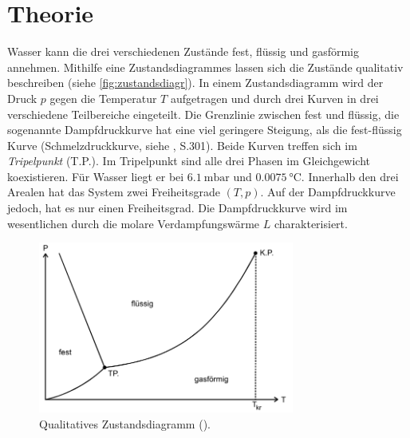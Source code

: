 \section{Theorie}
\label{sec:Theorie}
Wasser kann die drei verschiedenen Zustände fest, flüssig und gasförmig annehmen. Mithilfe eine Zustandsdiagrammes lassen sich die 
Zustände qualitativ beschreiben (siehe \autoref{fig:zustandsdiagr}). In einem Zustandsdiagramm wird der Druck $p$ gegen die Temperatur $T$ 
aufgetragen und durch drei Kurven in drei verschiedene Teilbereiche eingeteilt. Die Grenzlinie zwischen fest und flüssig, die sogenannte 
Dampfdruckkurve hat eine viel geringere Steigung, als die fest-flüssig Kurve (Schmelzdruckkurve, siehe \cite{gerthsen}, S.301). Beide Kurven
treffen sich im \textit{Tripelpunkt} (T.P.). Im Tripelpunkt sind alle drei Phasen im Gleichgewicht koexistieren. Für Wasser liegt er bei 
$\SI{6.1}{\milli\bar}$ und $\SI{0.0075}{\celsius}$.
Innerhalb den drei Arealen hat das System zwei Freiheitsgrade $(T,p)$. 
Auf der Dampfdruckkurve jedoch, hat es nur einen Freiheitsgrad.
Die Dampfdruckkurve wird im wesentlichen durch die molare Verdampfungswärme $L$ charakterisiert.

\begin{figure}[H]
    \centering
    \includegraphics[width=0.75\textwidth]{daten/Zustandsdiagramm.png}
    \caption{Qualitatives Zustandsdiagramm (\cite{anleitung}).}
    \label{fig:zustandsdiagr}
\end{figure}

